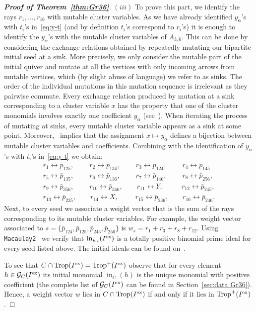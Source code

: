 \documentclass[10pt,a4paper]{amsart}
\numberwithin{equation}{section}
\DeclareMathOperator{\init}{in}
\DeclareMathOperator{\trop}{Trop}
\begin{document}
\begin{proof}[{\bf Proof of Theorem~\ref{thm:Gr36}}]
$(iii)$ To prove this part, we identify the rays $r_1,\dots,r_{16}$ with mutable cluster variables.
 As we have already identified $y_\alpha$'s with $t_i$'s in~\eqref{eq:y-t} (and by definition $t_i$'s correspond to $r_i$'s) it is enough to identify the $y_\alpha$'s with the mutable cluster variables of $A_{3,6}$.
 This can be done by considering the exchange relations obtained by repeatedly mutating our bipartite initial seed at a sink.
 More precisely, we only consider the mutable part of the initial quiver and mutate at all the vertices with only incoming arrows from mutable vertices, which (by slight abuse of language) we refer to as sinks.
 The order of the individual mutations in this mutation sequence is irrelevant as they pairwise commute.
 Every exchange relation produced by mutation at a sink corresponding to a cluster variable $x$ has the property that one of the cluster monomials involves exactly one coefficient $y_{\alpha}$ (see~\cite[Lemma~12.7]{FZ_clustersIV}).
 When iterating the process of mutating at sinks, every mutable cluster variable appears as a sink at some point.
 Moreover,~\cite[Lemma~12.8]{FZ_clustersIV} implies that the assignment $x \mapsto y_\alpha$ defines a bijection between mutable cluster variables and coefficients.
 Combining with the identification of $y_\alpha$'s with $t_i$'s in~\eqref{eq:y-t} we obtain:
\begin{gather*}
r_{1} \leftrightarrow \bar p_{125}, \qquad\ r_{2} \leftrightarrow \bar p_{134},\ \qquad r_{3} \leftrightarrow \bar p_{124},\ \qquad r_{4} \leftrightarrow \bar p_{145}
\\
r_{5} \leftrightarrow \bar p_{135}, \qquad\ r_{6} \leftrightarrow \bar p_{136},\ \qquad r_{7} \leftrightarrow \bar p_{146},\ \qquad r_{8} \leftrightarrow \bar p_{256},
\\
r_{9} \leftrightarrow \bar p_{356}, \qquad\ r_{10} \leftrightarrow \bar p_{346}, \qquad r_{11} \leftrightarrow Y, \ \ \ \qquad r_{12} \leftrightarrow \bar p_{245},
\\
r_{13} \leftrightarrow \bar p_{235},\qquad r_{14} \leftrightarrow X, \ \ \qquad r_{15} \leftrightarrow \bar p_{236}, \qquad r_{16} \leftrightarrow \bar p_{246}.
\end{gather*}
Next, to every seed we associate a weight vector that is the sum of the rays corresponding to its mutable cluster variables.
For example, the weight vector associated to $s=\{\bar p_{124},\bar p_{125},\bar p_{245},\bar p_{256}\}$ is $w_s=r_1+r_3+r_8+r_{12}$.
Using \texttt{Macaulay2}~\cite{M2} we verify that $\init_{w_s}(I^{\rm ex})$ is a totally positive binomial prime ideal for every seed listed above.
The initial ideals can be found on~\cite{homepage}.

To see that $C\cap \trop(I^{\rm ex})=\trop^+(I^{\rm ex})$ observe that for every element $h\in \mathcal G_C(I^{\rm ex})$ its initial monomial $\init_C(h)$ is the unique monomial with positive coefficient (the complete list of $\mathcal G_C(I^{\rm ex})$ can be found in Section~\ref{sec:data Gr36}).
Hence, a weight vector $w$ lies in $C\cap \trop(I^{\rm ex})$ if and only if it lies in $\trop^+(I^{\rm ex})$.
\end{proof}
\end{document}
